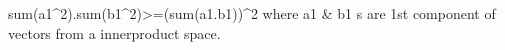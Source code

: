 sum(a1^2).sum(b1^2)>=(sum(a1.b1))^2
where a1 & b1 s are 1st component of vectors from a innerproduct space.
